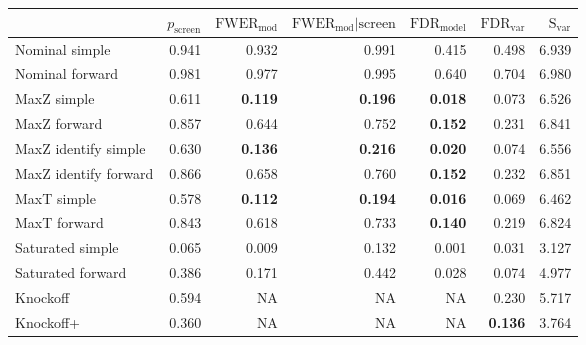 
\newcommand{\guarantee}[1]{{\bf #1}}
\begin{tabular}{|l|rrrrrr|}
 \hline
{} &  $p_{\text{screen}}$ &  $\text{FWER}_{\text{mod}}$ &  $\text{FWER}_{\text{mod}} \vert \text{screen}$ &  $\text{FDR}_{\text{model}}$ &  $\text{FDR}_{\text{var}}$ &  $\text{S}_{\text{var}}$ \\ \hline
Nominal simple & 0.941 & 0.932 & 0.991 & 0.415 & 0.498 & 6.939 \\ 
Nominal forward & 0.981 & 0.977 & 0.995 & 0.640 & 0.704 & 6.980 \\ 
MaxZ simple & 0.611 & \guarantee{0.119} & \guarantee{0.196} & \guarantee{0.018} & 0.073 & 6.526 \\ 
MaxZ forward & 0.857 & 0.644 & 0.752 & \guarantee{0.152} & 0.231 & 6.841 \\ 
MaxZ identify simple & 0.630 & \guarantee{0.136} & \guarantee{0.216} & \guarantee{0.020} & 0.074 & 6.556 \\ 
MaxZ identify forward & 0.866 & 0.658 & 0.760 & \guarantee{0.152} & 0.232 & 6.851 \\ 
MaxT simple & 0.578 & \guarantee{0.112} & \guarantee{0.194} & \guarantee{0.016} & 0.069 & 6.462 \\ 
MaxT forward & 0.843 & 0.618 & 0.733 & \guarantee{0.140} & 0.219 & 6.824 \\ 
Saturated simple & 0.065 & 0.009 & 0.132 & 0.001 & 0.031 & 3.127 \\ 
Saturated forward & 0.386 & 0.171 & 0.442 & 0.028 & 0.074 & 4.977 \\ 
Knockoff & 0.594 & NA & NA & NA & 0.230 & 5.717 \\ 
Knockoff+ & 0.360 & NA & NA & NA & \guarantee{0.136} & 3.764 \\   \hline
\end{tabular}